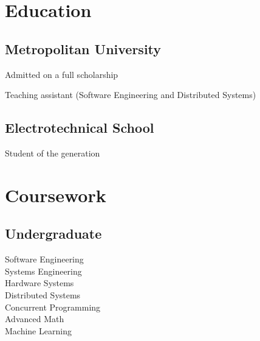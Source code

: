 \documentclass[]{matija-resume}
\begin{document}
\begin{minipage}[t]{0.33\textwidth}

\section{Education}

\subsection{Metropolitan University}
\vspace{\topsep}
\begin{tightemize}
\item Admitted on a full scholarship
\item Teaching assistant (Software Engineering and Distributed Systems)
\end{tightemize}
\sectionsep

\subsection{Electrotechnical School}
\vspace{\topsep}
\begin{tightemize}
\item Student of the generation
\end{tightemize}
\sectionsep


\section{Coursework}
\subsection{Undergraduate}
Software Engineering \\
Systems Engineering \\
Hardware Systems \\
Distributed Systems \\
Concurrent Programming \\
Advanced Math \\
Machine Learning \\
\sectionsep

%
%

\end{minipage}
\end{document}
